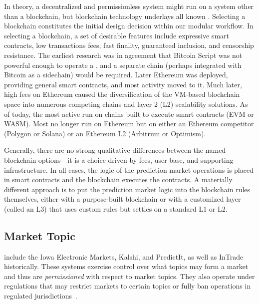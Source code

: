 In theory, a decentralized and permissionless system might run on a system other than a blockchain, but blockchain technology underlays all known \depms. Selecting a blockchain constitutes the initial design decision within our modular workflow. In selecting a blockchain, a set of desirable features include expressive smart contracts, low transactions fees, fast finality, guaranteed inclusion, and censorship resistance. The earliest research was in agreement that Bitcoin Script was not powerful enough to operate a \depm, and a separate chain (perhaps integrated with Bitcoin as a sidechain) would be required. Later Ethereum was deployed, providing general smart contracts, and most \depm activity moved to it. Much later, high fees on Ethereum caused the diversification of the VM-based blockchain space into numerous competing chains and layer 2 (L2) scalability solutions. As of today, the most active \depms run on chains built to execute smart contracts (\eg EVM or WASM). Most no longer run on Ethereum but on either an Ethereum competitor (\eg Polygon or Solana) or an Ethereum L2 (\eg Arbitrum or Optimism).

Generally, there are no strong qualitative differences between the named blockchain options---it is a choice driven by fees, user base, and supporting infrastructure. In all cases, the logic of the prediction market operations is placed in smart contracts and the blockchain executes the contracts. A materially different approach is  to put the prediction market logic into the blockchain rules themselves, either with a purpose-built blockchain or with a customized layer (called an L3) that uses custom rules but settles on a standard L1 or L2.




\subsection{Market Topic}\label{wf:topic}

\cepms include the Iowa Electronic Markets, Kalshi, and PredictIt, as well as InTrade historically. These systems exercise control over what topics may form a market and thus are \textit{permissioned} with respect to market topics. They also operate under regulations that may restrict markets to certain topics or fully ban operations in regulated jurisdictions~\cite{Du19}. 


